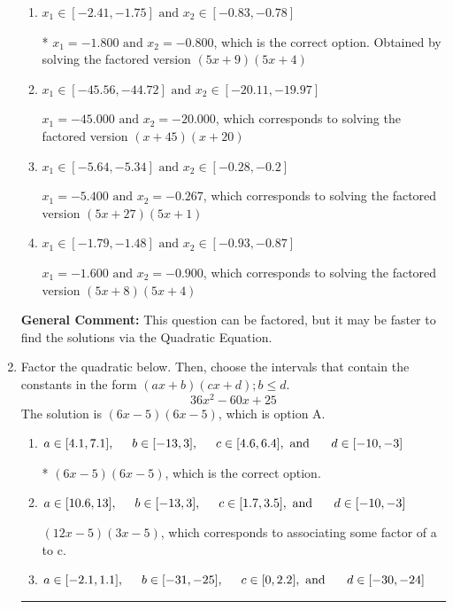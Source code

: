 \documentclass{extbook}[14pt]
\newcommand{\litem}[1]{\item #1

\rule{\textwidth}{0.4pt}}
\begin{document}
\begin{enumerate}
{\begin{enumerate}[label=\Alph*.]
$x_1 = -9.000 \text{ and } x_2 = -0.160$, which corresponds to solving the factored version $(x + 9)(25x + 4)$
\item \( x_1 \in [-2.41, -1.75] \text{ and } x_2 \in [-0.83, -0.78] \)

* $x_1 = -1.800 \text{ and } x_2 = -0.800$, which is the correct option. Obtained by solving the factored version $(5x + 9)(5x + 4)$
\item \( x_1 \in [-45.56, -44.72] \text{ and } x_2 \in [-20.11, -19.97] \)

$x_1 = -45.000 \text{ and } x_2 = -20.000$, which corresponds to solving the factored version $(x + 45)(x + 20)$
\item \( x_1 \in [-5.64, -5.34] \text{ and } x_2 \in [-0.28, -0.2] \)

$x_1 = -5.400 \text{ and } x_2 = -0.267$, which corresponds to solving the factored version $(5x + 27)(5x + 1)$
\item \( x_1 \in [-1.79, -1.48] \text{ and } x_2 \in [-0.93, -0.87] \)

$x_1 = -1.600 \text{ and } x_2 = -0.900$, which corresponds to solving the factored version $(5x + 8)(5x + 4)$
\end{enumerate}

\textbf{General Comment:} This question can be factored, but it may be faster to find the solutions via the Quadratic Equation.
}
\litem{
Factor the quadratic below. Then, choose the intervals that contain the constants in the form $(ax+b)(cx+d); b \leq d.$
\[ 36x^{2} -60 x + 25 \]The solution is \( (6x -5)(6x -5) \), which is option A.\begin{enumerate}[label=\Alph*.]
\item \( a \in [4.1, 7.1], \hspace*{5mm} b \in [-13, 3], \hspace*{5mm} c \in [4.6, 6.4], \text{ and } \hspace*{5mm} d \in [-10, -3] \)

* $(6x -5)(6x -5)$, which is the correct option.
\item \( a \in [10.6, 13], \hspace*{5mm} b \in [-13, 3], \hspace*{5mm} c \in [1.7, 3.5], \text{ and } \hspace*{5mm} d \in [-10, -3] \)

 $(12x -5)(3x -5)$, which corresponds to associating some factor of a to c.
\item \( a \in [-2.1, 1.1], \hspace*{5mm} b \in [-31, -25], \hspace*{5mm} c \in [0, 2.2], \text{ and } \hspace*{5mm} d \in [-30, -24] \)


\end{enumerate}}
\end{enumerate}
\end{document}

